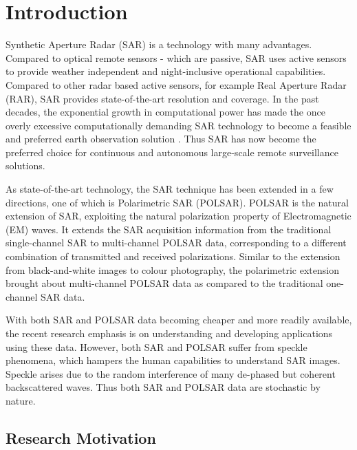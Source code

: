 \chapter{Introduction}

Synthetic Aperture Radar (SAR) is a technology with many advantages.
Compared to optical remote sensors - which are passive, SAR uses active sensors to provide weather independent and night-inclusive operational capabilities. 
Compared to other radar based active sensors,
for example Real Aperture Radar (RAR), SAR provides state-of-the-art resolution
and coverage.
In the past decades, the exponential growth in computational power has made the once overly excessive computationally demanding SAR technology to become a feasible and preferred earth observation solution \cite{Cumming_2005_Artech}.
Thus SAR has now become the preferred choice for continuous and autonomous large-scale
remote surveillance solutions.

As state-of-the-art technology, the SAR technique has been extended in a few directions, one of which is Polarimetric SAR (POLSAR).
POLSAR is the natural extension of SAR, exploiting the natural polarization property of Electromagnetic (EM) waves.
It extends the SAR acquisition information from the traditional single-channel SAR to multi-channel POLSAR data, corresponding to a different combination of transmitted and received polarizations. Similar to the extension from black-and-white images to colour photography, the polarimetric extension brought about
multi-channel POLSAR data as compared to the traditional one-channel SAR data.

With both SAR and POLSAR data becoming cheaper and more readily available, the recent research emphasis is on understanding and developing applications using these data. However, both SAR 
and POLSAR suffer from speckle phenomena, which hampers the human capabilities
to understand SAR images. Speckle arises due to the random interference of many
de-phased but coherent backscattered waves. Thus both SAR and POLSAR data are
stochastic by nature.

\section{Research Motivation}

